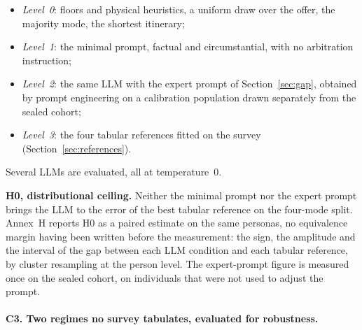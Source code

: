 \begin{itemize}
  \item \emph{Level~0}: floors and physical heuristics, a uniform draw over the offer, the majority mode, the shortest itinerary;
  \item \emph{Level~1}: the minimal prompt, factual and circumstantial, with no arbitration instruction;
  \item \emph{Level~2}: the same LLM with the expert prompt of Section~\ref{sec:gap}, obtained by prompt engineering on a calibration population drawn separately from the sealed cohort;
  \item \emph{Level~3}: the four tabular references fitted on the survey (Section~\ref{sec:references}).
\end{itemize}

Several LLMs are evaluated, all at temperature~0.

\textbf{H0, distributional ceiling.} Neither the minimal prompt nor the expert prompt brings the LLM to the error of the best tabular reference on the four-mode split. Annex~H reports H0 as a paired estimate on the same personas, no equivalence margin having been written before the measurement: the sign, the amplitude and the interval of the gap between each LLM condition and each tabular reference, by cluster resampling at the person level.
The expert-prompt figure is measured once on the sealed cohort, on individuals that were not used to adjust the prompt.

\paragraph{C3. Two regimes no survey tabulates, evaluated for robustness.}

